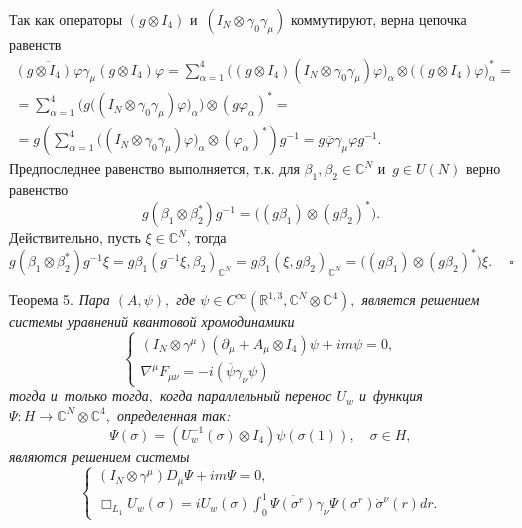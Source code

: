 \smallskip

\proof
Так как операторы $(g\otimes I_4)$ и~$(I_N\otimes\gamma_0\gamma_\mu)$ коммутируют,
верна цепочка равенств
\begin{multline*}
\overline{(g\otimes I_4)\varphi}\gamma_\mu (g\otimes I_4)\varphi=\sum_{\alpha=1}^4
\bigl(
(g\otimes I_4 )(I_N\otimes\gamma_0\gamma_\mu)\varphi
\bigr)_\alpha\otimes
\bigl((g\otimes I_4)\varphi\bigr)_\alpha^\ast=\\
=\sum_{\alpha=1}^4
\bigl(g
\bigl(
(I_N\otimes\gamma_0\gamma_\mu)\varphi
\bigr)_\alpha
\bigr)\otimes (g\varphi_\alpha)^\ast=\\
=g\left(\sum_{\alpha=1}^4
\bigl(
(I_N\otimes\gamma_0\gamma_\mu)\varphi
\bigr)_\alpha\otimes (\varphi_\alpha)^\ast\right) g^{-1}=g\overline{\varphi}\gamma_\mu \varphi g^{-1}.
\end{multline*}
Предпоследнее равенство выполняется, т.к. для $\beta_1, \beta_2\in \mathbb{C}^N$ и~$g\in U(N)$
верно равенство
$$g(\beta_1\otimes\beta_2^\ast)g^{-1}=\bigl((g\beta_1)\otimes (g\beta_2)^\ast\bigr).$$
Действительно, пусть
 $\xi\in \mathbb{C}^N$, тогда
$$
g(\beta_1\otimes\beta_2^\ast)g^{-1}\xi=g\beta_1(g^{-1}\xi,\beta_2)_{\mathbb{C}^N}
=g\beta_1(\xi,g\beta_2)_{\mathbb{C}^N}=\bigl((g\beta_1)\otimes (g\beta_2)^\ast\bigr)\xi.~\quad \square
$$


\smallskip

\hypertarget{volk:th5}{}

{\small \sc Теорема 5.} {\it
Пара $(A,\psi),$ где $\psi \in C^\infty(\mathbb{R}^{1,3}, \mathbb{C}^N\otimes\mathbb{C}^4),$ является решением системы уравнений квантовой хромодинамики
\begin{equation}
\label{volk:qcdequation}
 \left\{
\begin{aligned}
(I_N\otimes\gamma^\mu)(\partial_\mu+A_\mu\otimes I_4)\psi+i m\psi=0,\\
\nabla^\mu F_{\mu\nu}=-i(\overline{\psi}\gamma_\nu\psi)
\end{aligned}
\right.
\end{equation}
 тогда и~только тогда$,$ когда параллельный перенос $U_{w}$ и~функция  $\Psi\colon H\to\mathbb{C}^N\otimes\mathbb{C}^4,$ определенная так\/{\rm :}
$$
\Psi(\sigma)= (U_{w}^{-1}(\sigma)\otimes I_4)\psi(\sigma(1)),\quad \sigma\in H,
$$
 являются решением системы
\begin{equation}
\label{volk:qcdequation3}
 \left\{
\begin{aligned}
(I_N\otimes\gamma^\mu) D_\mu\Psi+i m\Psi=0,\\
\Box_{L_{1}}U_{w}(\sigma)=iU_{w}(\sigma)\int_0^1\overline{\Psi(\sigma^r)}
\gamma_\nu\Psi(\sigma^r)\dot{\sigma}^\nu(r)dr.
\end{aligned}
\right.
\end{equation}
}

